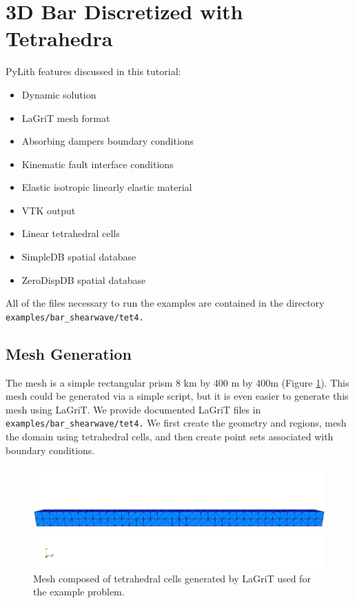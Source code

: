 
\section{\label{sec:tutorial:shearwave:tet4}3D Bar Discretized with Tetrahedra}

PyLith features discussed in this tutorial:
\begin{itemize}
\item Dynamic solution
\item LaGriT mesh format
\item Absorbing dampers boundary conditions
\item Kinematic fault interface conditions
\item Elastic isotropic linearly elastic material
\item VTK output
\item Linear tetrahedral cells
\item SimpleDB spatial database
\item ZeroDispDB spatial database
\end{itemize}
All of the files necessary to run the examples are contained in the
directory \texttt{examples/bar\_shearwave/tet4.}


\subsection{Mesh Generation}

The mesh is a simple rectangular prism 8 km by 400 m by 400m (Figure
\ref{fig:shearwave:tet4:mesh}). This mesh could be generated via
a simple script, but it is even easier to generate this mesh using
LaGriT. We provide documented LaGriT files in \texttt{examples/bar\_shearwave/tet4.}
We first create the geometry and regions, mesh the domain using tetrahedral
cells, and then create point sets associated with boundary conditions.

\noindent \begin{center}
\begin{figure}
\begin{centering}
\includegraphics[scale=0.5]{tutorials/shearwave/figs/tet4mesh}
\par\end{centering}

\caption{Mesh composed of tetrahedral cells generated by LaGriT used for the
example problem.\label{fig:shearwave:tet4:mesh}}
\end{figure}

\par\end{center}


